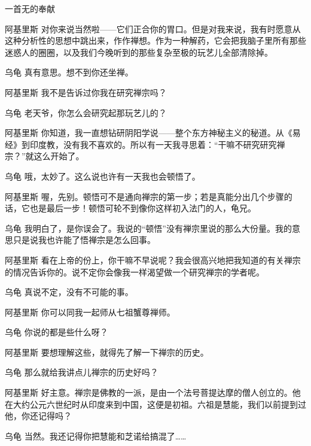 \begin{dialog}{一首无的奉献\label{abcd}}
\begin{dialogue}
\item[阿基里斯]对你来说当然啦——它们正合你的胃口。但是对我来说，我有时愿意从这种分析性的思想中跳出来，作作禅想。作为一种解药，它会把我脑子里所有那些迷惑人的圈圈，以及我们今晚听到的那些复杂至极的玩艺儿全部清除掉。

\item[乌龟]真有意思。想不到你还坐禅。

\item[阿基里斯]我不是告诉过你我在研究禅宗吗？

\item[乌龟]老天爷，你怎么会研究起那玩艺儿的？

\item[阿基里斯]你知道，我一直想钻研阴阳学说——整个东方神秘主义的秘道。从《易经》到印度教，没有我不喜欢的。所以有一天我寻思着：“干嘛不研究研究禅宗？”就这么开始了。

\item[乌龟]哦，太妙了。这么说也许有一天我也会顿悟了。

\item[阿基里斯]喔，先别。顿悟可不是通向禅宗的第一步；若是真能分出几个步骤的话，它也是最后一步！顿悟可轮不到像你这样初入法门的人，龟兄。

\item[乌龟]我明白了，是你误会了。我说的“顿悟”没有禅宗里说的那么大份量。我的意思只是说我也许能了悟禅宗是怎么回事。

\item[阿基里斯]看在上帝的份上，你干嘛不早说呢？我会很高兴地把我知道的有关禅宗的情况告诉你的。说不定你会像我一样渴望做一个研究禅宗的学者呢。

\item[乌龟]真说不定，没有不可能的事。

\item[阿基里斯]你可以同我一起师从七祖蟹尊禅师。

\item[乌龟]你说的都是些什么呀？

\item[阿基里斯]要想理解这些，就得先了解一下禅宗的历史。

\item[乌龟]那么就给我讲点儿禅宗的历史好吗？

\item[阿基里斯]好主意。禅宗是佛教的一派，是由一个法号菩提达摩的僧人创立的。他在大约公元六世纪时从印度来到中国，这便是初祖。六祖是慧能，我们以前提到过他，你还记得吗？

\item[乌龟]当然。我还记得你把慧能和芝诺给搞混了……


\end{dialogue}
\end{dialog}
